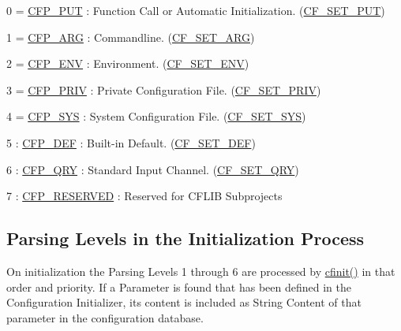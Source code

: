 \begin{DoxyItemize}
\item 0 = \hyperlink{group__cflib__core_ga764a8ea81ffc3940bf413797dcaf9a3d}{C\-F\-P\-\_\-\-P\-U\-T} \-: Function Call or Automatic Initialization.  (\hyperlink{group__special__options__mask_ga8d6cd1608fef5638efe964da63edf2dd}{C\-F\-\_\-\-S\-E\-T\-\_\-\-P\-U\-T})
\begin{DoxyItemize}
\item 1 = \hyperlink{group__cflib__core_ga0901da5871f3cffeec56e491f8c9fc7f}{C\-F\-P\-\_\-\-A\-R\-G} \-: Commandline.  (\hyperlink{group__special__options__mask_ga1b3eb474a5160e5a32385f6de53d90d6}{C\-F\-\_\-\-S\-E\-T\-\_\-\-A\-R\-G})
\item 2 = \hyperlink{group__cflib__core_gac77d72299f32e91104090cdeb93f3619}{C\-F\-P\-\_\-\-E\-N\-V} \-: Environment.  (\hyperlink{group__special__options__mask_ga29dbd098a75a23ddc42b3b53e430d694}{C\-F\-\_\-\-S\-E\-T\-\_\-\-E\-N\-V})
\item 3 = \hyperlink{group__cflib__core_ga6cf8dcc9fa01deae5eb44698cb01f73e}{C\-F\-P\-\_\-\-P\-R\-I\-V} \-: Private Configuration File.  (\hyperlink{group__special__options__mask_gaabf1d4d312964af93bd55f71eeec6988}{C\-F\-\_\-\-S\-E\-T\-\_\-\-P\-R\-I\-V})
\item 4 = \hyperlink{group__cflib__core_ga0365a86453eeaa815a79c506343bd927}{C\-F\-P\-\_\-\-S\-Y\-S} \-: System Configuration File.  (\hyperlink{group__special__options__mask_ga8fe09807491ee119290329cf08e6f340}{C\-F\-\_\-\-S\-E\-T\-\_\-\-S\-Y\-S})
\item 5 \-: \hyperlink{group__cflib__core_gafa9b2b859f08e9b319cc50555255a975}{C\-F\-P\-\_\-\-D\-E\-F} \-: Built-\/in Default.  (\hyperlink{group__special__options__mask_ga17b4ef5b35afe21a4a80faa671030b65}{C\-F\-\_\-\-S\-E\-T\-\_\-\-D\-E\-F})
\item 6 \-: \hyperlink{group__cflib__core_ga91ce348a0630961b0c472e7dec732aae}{C\-F\-P\-\_\-\-Q\-R\-Y} \-: Standard Input Channel.  (\hyperlink{group__special__options__mask_ga09dcbb96c5ace43a7d5e7e4f52d387a8}{C\-F\-\_\-\-S\-E\-T\-\_\-\-Q\-R\-Y})
\item 7 \-: \hyperlink{group__cflib__core_ga631bc61e35c14f1d3df36a71154a776a}{C\-F\-P\-\_\-\-R\-E\-S\-E\-R\-V\-E\-D} \-: Reserved for C\-F\-L\-I\-B Subprojects
\end{DoxyItemize}
\end{DoxyItemize}\hypertarget{config_levels_initialization_process}{}\subsection{Parsing Levels in the Initialization Process}\label{config_levels_initialization_process}
On initialization the Parsing Levels 1 through 6 are processed by \hyperlink{group__cflib__core_ga64fb341565c2ddfccd6669e5e6265a8a}{cfinit()} in that order and priority. If a Parameter is found that has been defined in the Configuration Initializer, its content is included as String Content of that parameter in the configuration database.

